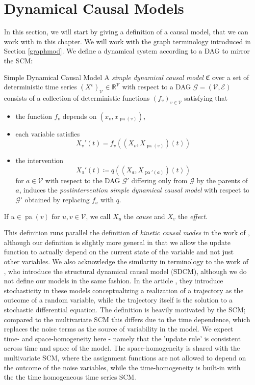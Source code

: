 \documentclass[11pt, a4paper]{memoir}
\theoremstyle{break}
\theoremstyle{break}
\theoremstyle{nonumberplain}
\newcommand{\mR}{\mathbb{R}}
\DeclareMathOperator{\pa}{pa}
\begin{document}
\section{Dynamical Causal Models}
In this section, we will start by giving a definition of a causal model, that we can work with in this chapter. We will work with the graph terminology introduced in Section \ref{graphmod}. We define a dynamical system according to a DAG to mirror the SCM:
\begin{mydefinition}{Simple Dynamical Causal Model}
A \emph{simple dynamical causal model} $\mathfrak{C}$ over a set of deterministic time series $(X^v)_\mathcal{V}\in \mR^\mathcal{V}$ with respect to a DAG $\mathcal{G}=(\mathcal{V},\mathcal{E})$ consists of a collection of deterministic functions $(f_v)_{v\in \mathcal{V}}$ satisfying that
\begin{itemize}
	\item the function $f_v$ depends on $\left(x_v,x_{\pa(v)} \right)$,
	\item each variable satisfies
	$$ X_v'(t)=f_v\left(\left(X_v,X_{\pa(v)}\right)(t)\right)$$
	\item the intervention 
	$$X_a'
	(t)\coloneqq q\left((X_a,X_{\pa'(a)})(t)\right)$$ 
	for $a\in \mathcal{V}$ with respect to the DAG $\mathcal{G}'$ differing only from $\mathcal{G}$ by the parents of $a$, induces the \emph{postintervention simple dynamical causal model} with respect to $\mathcal{G}'$ obtained by replacing $f_a$ with $q$.
\end{itemize}
If $u\in \pa(v)$ for $u,v\in \mathcal{V}$, we call $X_u$ the \emph{cause} and $X_v$ the \emph{effect}. 
\end{mydefinition}
This definition runs parallel the definition of \emph{kinetic causal modes} in the work of \cite{KCM}, although our definition is slightly more general in that we allow the update function to actually depend on the current state of the variable and not just other variables. We also acknowledge the similarity in terminology to the work of \cite{Bongers}, who introduce the structural dynamical causal model (SDCM), although we do not define our models in the same fashion. In the article \cite{Bongers}, they introduce stochasticity in these models conceptualizing a realization of a trajectory as the outcome of a random variable, while the trajectory itself is the solution to a stochastic differential equation. The definition is heavily motivated by the SCM; compared to the multivariate SCM this differs due to the time dependence, which replaces the noise terms as the source of variability in the model. We expect time- and space-homogeneity here - namely that the 'update rule' is consistent across time and space of the model. The space-homogeneity is shared with the multivariate SCM, where the assignment functions are not allowed to depend on the outcome of the noise variables, while the time-homogeneity is built-in with the the time homogeneous time series SCM.\\\\
\end{document}
